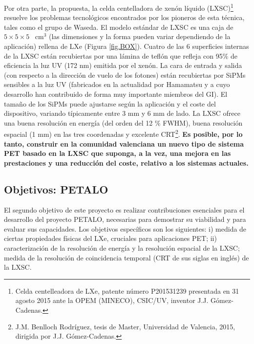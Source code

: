 Por otra parte, la propuesta, la celda centelladora de xenón líquido (LXSC)\footnote{Celda centelleadora de LXe, patente número P201531239 presentada en 31 agosto 2015 ante la OPEM (MINECO), CSIC/UV, inventor J.J. Gómez-Cadenas.} resuelve los problemas tecnológicos encontrados por los pioneros de esta técnica, tales como el grupo de Waseda. El modelo estándar de LXSC es una caja de $5\times 5 \times 5$~ cm$^3$ (las dimensiones y la forma pueden variar dependiendo de la aplicación) rellena de LXe (Figura \ref{fig.BOX}). Cuatro de las 6 superficies internas de la LXSC están recubiertas por una lámina de teflón que refleja con 95\% de eficiencia la luz UV (172 nm) emitida por el xenón. La cara de entrada y salida (con respecto a la dirección de vuelo de los fotones) están recubiertas por SiPMs sensibles a la luz UV (fabricados en la actualidad por Hamamatsu y a cuyo desarrollo han contribuido de forma muy importante miembros del GI). El tamaño de los SiPMs puede ajustarse según la aplicación y el coste del dispositivo, variando típicamente entre 3 mm y 6 mm de lado. La LXSC ofrece una buena resolución en energía (del orden del 12 \% FWHM), buena resolución espacial (1 mm) en las tres coordenadas y excelente CRT\footnote{J.M. Benlloch Rodríguez, tesis de Master, Universidad de Valencia, 2015, dirigida por J.J. Gómez-Cadenas. 
}. {\bf Es posible, por lo tanto, construir en la comunidad valenciana un nuevo tipo de sistema PET basado en la LXSC que suponga, a la vez, una mejora en las prestaciones y una reducción del coste, relativo a los sistemas actuales.}
\subsection*{Objetivos: PETALO}

El segundo objetivo de este proyecto es realizar contribuciones esenciales para el desarrollo del proyecto PETALO, necesarias para demostrar su viabilidad y para evaluar sus capacidades. Los objetivos específicos son los siguientes: i) medida de ciertas propiedades físicas del LXe, cruciales para aplicaciones PET;  ii) caracterización de la resolución de energía y la resolución espacial de la LXSC; medida de la resolución de coincidencia temporal (CRT de sus siglas en inglés) de la LXSC.


